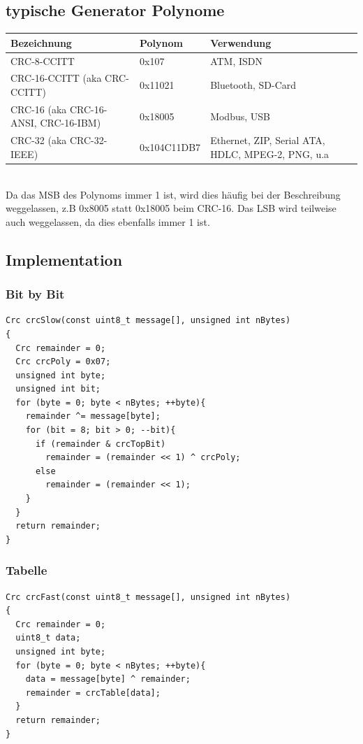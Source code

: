 \subsection{typische Generator Polynome}
  \begin{tabular}{|p{3.5cm} l p{10cm}|}
  \hline
    \textbf{Bezeichnung} &
    \textbf{Polynom} & 
    \textbf{Verwendung}\\
  \hline
    CRC-8-CCITT & 
    0x107 & 
    ATM, ISDN \\
  \hline
    CRC-16-CCITT \newline (aka CRC-CCITT) &
    0x11021 &
    Bluetooth, SD-Card \\
  \hline
    CRC-16 \newline (aka CRC-16-ANSI, CRC-16-IBM) &
    0x18005 &
    Modbus, USB \\
  \hline
    CRC-32 \newline (aka CRC-32-IEEE) &
    0x104C11DB7 &
    Ethernet, ZIP, Serial ATA, HDLC, MPEG-2, PNG, u.a\\
  \hline
  \end{tabular}\\
  
  Da das MSB des Polynoms immer 1 ist, wird dies häufig bei der Beschreibung weggelassen, z.B 0x8005 statt
  0x18005 beim CRC-16. \newline
  Das LSB wird teilweise auch weggelassen, da dies ebenfalls immer 1 ist.
  
\subsection{Implementation}
\subsubsection{Bit by Bit}
\begin{lstlisting}[style=Cpp]
Crc crcSlow(const uint8_t message[], unsigned int nBytes)
{
  Crc remainder = 0;
  Crc crcPoly = 0x07;
  unsigned int byte;
  unsigned int bit;
  for (byte = 0; byte < nBytes; ++byte){
    remainder ^= message[byte];
    for (bit = 8; bit > 0; --bit){
      if (remainder & crcTopBit)
        remainder = (remainder << 1) ^ crcPoly;
      else
        remainder = (remainder << 1);
    }
  }
  return remainder;
}
\end{lstlisting}

\subsubsection{Tabelle}
\begin{lstlisting}[style=Cpp]
Crc crcFast(const uint8_t message[], unsigned int nBytes)
{
  Crc remainder = 0;
  uint8_t data;
  unsigned int byte;
  for (byte = 0; byte < nBytes; ++byte){
    data = message[byte] ^ remainder;
    remainder = crcTable[data];
  }
  return remainder;
}
\end{lstlisting}



